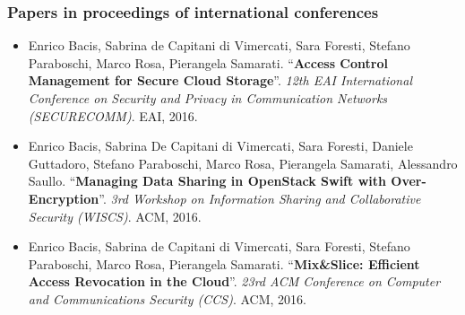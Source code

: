 {\subsubsection*{Papers in proceedings of international conferences}
\begin{itemize}	
	
	\nocite{securecomm}
	\item Enrico Bacis, Sabrina de Capitani di Vimercati, Sara Foresti, Stefano Paraboschi, Marco Rosa, Pierangela Samarati. ``\textbf{Access Control Management for Secure Cloud Storage}''. {\em 12th EAI International Conference on Security and Privacy in Communication Networks (SECURECOMM)}. EAI, 2016.
	
	\nocite{wiscs}
	\item Enrico Bacis, Sabrina De Capitani di Vimercati, Sara Foresti, Daniele Guttadoro, Stefano Paraboschi, Marco Rosa, Pierangela Samarati, Alessandro Saullo. ``\textbf{Managing Data Sharing in OpenStack Swift with Over-Encryption}''. {\em 3rd Workshop on Information Sharing and Collaborative Security (WISCS)}. ACM, 2016.
	
	\nocite{ccs}
	\item Enrico Bacis, Sabrina de Capitani di Vimercati, Sara Foresti, Stefano Paraboschi, Marco Rosa, Pierangela Samarati. ``\textbf{Mix\&Slice: Efficient Access Revocation in the Cloud}''. {\em 23rd ACM Conference on Computer and Communications Security (CCS)}. ACM, 2016.
	
	\nocite{cscloud}
	
	\nocite{cns}
	
	\nocite{spc}
	

\end{itemize}}

